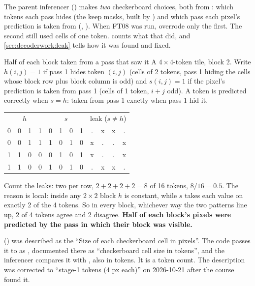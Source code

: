 The parent inferencer () makes \emph{two}
checkerboard choices, both from : which tokens each pass hides (the keep masks,
built by ) and which pass each pixel's prediction is taken from (,
). When FT08 was run,  overrode only the first. The second still
used cells of one token.  counts what that did, and \cref{sec:decoderwork:leak} tells how
it was found and fixed.

\begin{worked}[label={we:decoderwork:leak}]{Half of each block taken from a pass that saw it}
A $4\times4$-token tile, block 2. Write $h(i,j)=1$ if pass 1 hides token $(i,j)$ (cells of 2 tokens, pass 1 hiding
the cells whose block row plus block column is odd) and $s(i,j)=1$ if the pixel's prediction is taken from pass 1
(cells of 1 token, $i+j$ odd). A token is predicted correctly when $s=h$: taken from pass 1 exactly when pass 1 hid
it.
\begin{center}\small\ttfamily
\begin{tabular}{cccc@{\qquad}cccc@{\qquad}cccc}
\multicolumn{4}{c}{$h$} & \multicolumn{4}{c}{$s$} & \multicolumn{4}{c}{leak ($s\ne h$)}\\
0&0&1&1 & 0&1&0&1 & .&x&x&.\\
0&0&1&1 & 1&0&1&0 & x&.&.&x\\
1&1&0&0 & 0&1&0&1 & x&.&.&x\\
1&1&0&0 & 1&0&1&0 & .&x&x&.\\
\end{tabular}
\end{center}
Count the leaks: two per row, $2+2+2+2=8$ of 16 tokens, $8/16=0.5$. The reason is local: inside any $2\times2$
block $h$ is constant, while $s$ takes each value on exactly 2 of the 4 tokens. So in every block, whichever way
the two patterns line up, 2 of 4 tokens agree and 2 disagree. \textbf{Half of each block's pixels were predicted by
the pass in which their block was visible.}
\end{worked}

\begin{sourcenote}
 () was described as
the ``Size of each checkerboard cell in pixels''. The code passes it to  as
, documented there as ``checkerboard cell size in tokens'', and the inferencer compares it
with , also in tokens. It is a token count. The description was corrected to ``stage-1 tokens
(4 px each)'' on 2026-10-21 after the course found it.
\end{sourcenote}

